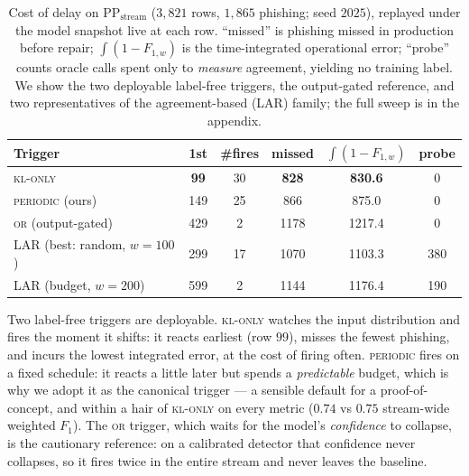 \begin{table}[H]
\centering
\caption{Cost of delay on $\mathrm{PP_{stream}}$ ($3{,}821$ rows, $1{,}865$
phishing; seed $2025$), replayed under the model snapshot live at each row.
``missed'' is phishing missed in production before repair; $\int(1{-}F_{1,w})$ is
the time-integrated operational error; ``probe'' counts oracle calls spent only
to \emph{measure} agreement, yielding no training label. We show the two
deployable label-free triggers, the output-gated reference, and two
representatives of the agreement-based (LAR) family; the full sweep is in the
appendix.}
\label{tab:al-delay}
\small
\begin{tabular}{@{}lccccc@{}}
\toprule
Trigger & 1st & \#fires & missed & $\int(1{-}F_{1,w})$ & probe \\
\midrule
\textsc{kl-only}            & \textbf{99}  & 30 & \textbf{828}  & \textbf{830.6}  & 0 \\
\textsc{periodic} (ours)    & 149 & 25 & 866  & 875.0  & 0 \\
\textsc{or} (output-gated)  & 429 & 2  & 1178 & 1217.4 & 0 \\
\midrule
LAR (best: random, $w{=}100$) & 299 & 17 & 1070 & 1103.3 & 380 \\
LAR (budget, $w{=}200$)       & 599 & 2  & 1144 & 1176.4 & 190 \\
\bottomrule
\end{tabular}
\end{table}

Two label-free triggers are deployable. \textsc{kl-only} watches the input
distribution and fires the moment it shifts: it reacts earliest (row $99$),
misses the fewest phishing, and incurs the lowest integrated error, at the cost
of firing often. \textsc{periodic} fires on a fixed schedule: it reacts a little
later but spends a \emph{predictable} budget, which is why we adopt it as the
canonical trigger --- a sensible default for a proof-of-concept, and within a
hair of \textsc{kl-only} on every metric ($0.74$ vs $0.75$ stream-wide weighted
$F_1$). The \textsc{or} trigger, which waits for the model's \emph{confidence} to
collapse, is the cautionary reference: on a calibrated detector that confidence
never collapses, so it fires twice in the entire stream and never leaves the
baseline.

